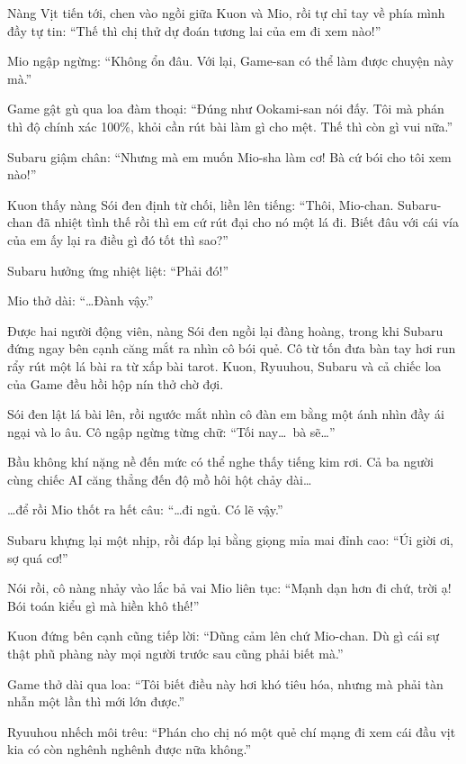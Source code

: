 \documentclass[../main.tex]{subfiles}
\begin{document}
Nàng Vịt tiến tới, chen vào ngồi giữa Kuon và Mio, rồi tự chỉ tay về phía mình đầy tự tin: ``Thế thì chị thử dự đoán tương lai của em đi xem nào!''

Mio ngập ngừng: ``Không ổn đâu. Với lại, Game-san có thể làm được chuyện này mà.''

Game gật gù qua loa đàm thoại: ``Đúng như Ookami-san nói đấy. Tôi mà phán thì độ chính xác 100\%, khỏi cần rút bài làm gì cho mệt. Thế thì còn gì vui nữa.''

Subaru giậm chân: ``Nhưng mà em muốn Mio-sha làm cơ! Bà cứ bói cho tôi xem nào!''

Kuon thấy nàng Sói đen định từ chối, liền lên tiếng: ``Thôi, Mio-chan. Subaru-chan đã nhiệt tình thế rồi thì em cứ rút đại cho nó một lá đi. Biết đâu với cái vía của em ấy lại ra điều gì đó tốt thì sao?''

Subaru hưởng ứng nhiệt liệt: ``Phải đó!''

Mio thở dài: ``\dots Đành vậy.''

Được hai người động viên, nàng Sói đen ngồi lại đàng hoàng, trong khi Subaru đứng ngay bên cạnh căng mắt ra nhìn cô bói quẻ. Cô từ tốn đưa bàn tay hơi run rẩy rút một lá bài ra từ xấp bài tarot. Kuon, Ryuuhou, Subaru và cả chiếc loa của Game đều hồi hộp nín thở chờ đợi.

Sói đen lật lá bài lên, rồi ngước mắt nhìn cô đàn em bằng một ánh nhìn đầy ái ngại và lo âu. Cô ngập ngừng từng chữ: ``Tối nay\dots\ bà sẽ\dots''

Bầu không khí nặng nề đến mức có thể nghe thấy tiếng kim rơi. Cả ba người cùng chiếc AI căng thẳng đến độ mồ hôi hột chảy dài\dots

\dots để rồi Mio thốt ra hết câu: ``\dots đi ngủ. Có lẽ vậy.''

Subaru khựng lại một nhịp, rồi đáp lại bằng giọng mỉa mai đỉnh cao: ``Úi giời ơi, sợ quá cơ!''

Nói rồi, cô nàng nhảy vào lắc bả vai Mio liên tục: ``Mạnh dạn hơn đi chứ, trời ạ! Bói toán kiểu gì mà hiền khô thế!''


Kuon đứng bên cạnh cũng tiếp lời: ``Dũng cảm lên chứ Mio-chan. Dù gì cái sự thật phũ phàng này mọi người trước sau cũng phải biết mà.''

Game thở dài qua loa: ``Tôi biết điều này hơi khó tiêu hóa, nhưng mà phải tàn nhẫn một lần thì mới lớn được.''

Ryuuhou nhếch môi trêu: ``Phán cho chị nó một quẻ chí mạng đi xem cái đầu vịt kia có còn nghênh nghênh được nữa không.''
\end{document}
